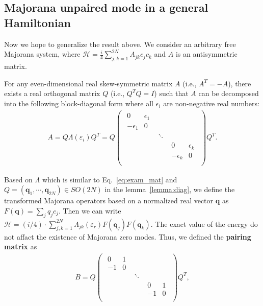  \subsection{Majorana unpaired mode in a general Hamiltonian}
Now we hope to generalize the result above.   We consider an arbitrary free Majorana system, where $\mathcal{H} =  \frac{i}{4}\sum_{j,k = 1}^{2N}A_{jk}c_jc_k$ and $A$ is an antisymmetric matrix. 
\begin{lemma}
\label{lemma:diag}
For any even-dimensional real skew-symmetric matrix $A$ (i.e., $A^T = -A$), there exists a real orthogonal matrix $Q$ (i.e., $Q^T Q = I$) such that $A$ can be decomposed into the following block-diagonal form where all $\epsilon_i$ are non-negative real numbers:
\begin{align}
    A = Q\Lambda(\varepsilon_i) Q^T = Q
\begin{pmatrix}
\begin{matrix} 0 & \epsilon_1 \\ -\epsilon_1 & 0 \end{matrix} & &  \\
& \ddots & \\
 & & \begin{matrix} 0 & \epsilon_k \\ -\epsilon_k & 0 \end{matrix} \\
\end{pmatrix}
Q^T.
\end{align}

\end{lemma}
Based on $\Lambda$ which is similar to Eq.~\eqref{eq:exam_mat} and $Q = (\mathbf{q}_1,\cdots,\mathbf{q}_{2N}) \in SO(2N)$ in the lemma~\ref{lemma:diag},  we define the transformed Majorana operators based on a normalized real vector $\mathbf{q}$ as $F(\mathbf{q}) = \sum_{j}q_jc_j$.  Then we can write $    \mathcal{H} = ({i}/{4})\cdot\sum_{j,k =1}^{2N} \Lambda_{jk}(\varepsilon_{r}) F(\mathbf{q}_j)F(\mathbf{q}_k)$.
The exact value of the energy do not affact the existence of Majorana zero modes. Thus, we defined the \textbf{pairing matrix} as
\begin{align}
    B =Q \begin{pmatrix}
\begin{matrix} 0 & 1 \\ -1 & 0 \end{matrix} & &  \\
& \ddots & \\
 & & \begin{matrix} 0 & 1 \\ -1 & 0 \end{matrix} \\
\end{pmatrix}Q^T,
\end{align}

